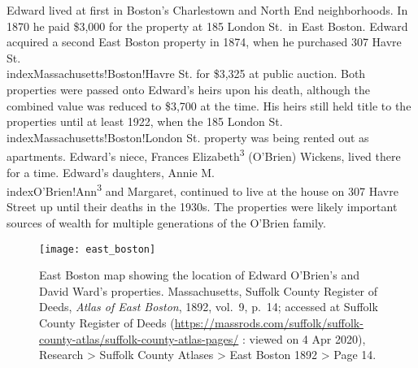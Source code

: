 Edward lived at first in Boston's Charlestown\cite{MaryAnn3OBrienBirth} and North End\cite{Edward3OBrienBirth} neighborhoods. In 1870 he paid \$3,000 for the property at 185 London St.\ in East Boston.\cite{LondonStDeed,LondonStMap} Edward acquired a second East Boston property in 1874, when he purchased 307 Havre St.\\index{Massachusetts!Boston!Havre St.} for \$3,325 at public auction.\cite{HavrePurchase,HavreMap} Both properties were passed onto Edward's heirs upon his death, although the combined value was reduced to \$3,700 at the time.\cite{Edward2OBrienProbate} His heirs still held title to the properties until at least 1922,\cite{Bromley1922} when the 185 London St.\\index{Massachusetts!Boston!London St.} property was being rented out as apartments.\cite{GlobeRobbery} Edward's niece, Frances Elizabeth\textsuperscript{3} (O'Brien) Wickens, lived there for a time.\cite{Frances3OBrien1914} Edward's daughters, Annie M.\\index{O'Brien!Ann\textsuperscript{3}} and Margaret, continued to live at the house on 307 Havre Street up until their deaths in the 1930s.\cite{AnnMaria3OBrienDeath,Margaret3OBrienDeath} The properties were likely important sources of wealth for multiple generations of the O'Brien family.

\begin{figure}
	\centering
	\texttt{[image: east\_boston]}
	\caption{East Boston map showing the location of Edward O'Brien's and David Ward's properties. Massachusetts, Suffolk County Register of Deeds, \textit{Atlas of East Boston}, 1892, vol.\ 9, p.\ 14; accessed at Suffolk County Register of Deeds (\url{https://massrods.com/suffolk/suffolk-county-atlas/suffolk-county-atlas-pages/} : viewed on 4 Apr 2020), Research > Suffolk County Atlases > East Boston 1892 > Page 14.}
\end{figure}

